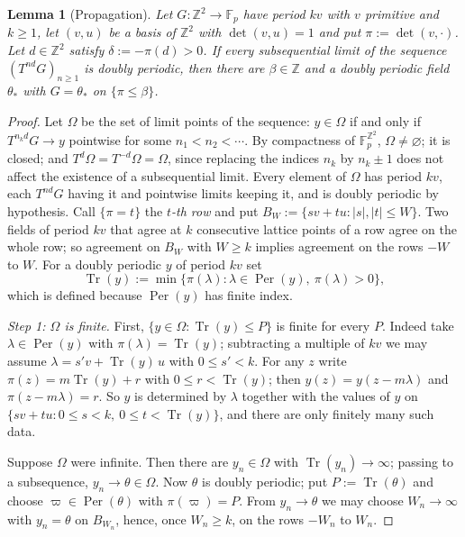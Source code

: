 \documentclass[11pt,reqno]{amsart}
\theoremstyle{plain}
\newtheorem{lem}[thm]{Lemma}
\theoremstyle{definition}
\theoremstyle{remark}
\theoremstyle{plain}
\theoremstyle{remark}
\theoremstyle{definition}
\numberwithin{equation}{section}
\DeclareMathOperator{\Per}{Per}
\DeclareMathOperator{\Tr}{Tr}
\newcommand{\Z}{\mathbb{Z}}
\newcommand{\Fp}{\mathbb{F}_p}
\begin{document}
\begin{lem}[Propagation]\label{lem:propagate2}
Let $G\colon\Z^2\to\Fp$ have period $kv$ with $v$ primitive and $k\ge1$, let
$(v,u)$ be a basis of $\Z^2$ with $\det(v,u)=1$ and put $\pi:=\det(v,\cdot)$.
Let $d\in\Z^2$ satisfy $\delta:=-\pi(d)>0$.  If every subsequential limit of the
sequence $(T^{nd}G)_{n\ge1}$ is doubly periodic, then there are $\beta\in\Z$ and
a doubly periodic field $\theta_*$ with $G=\theta_*$ on $\{\pi\le\beta\}$.
\end{lem}

\begin{proof}
Let $\Omega$ be the set of limit points of the sequence: $y\in\Omega$ if and only
if $T^{n_kd}G\to y$ pointwise for some $n_1<n_2<\cdots$.  By compactness of
$\Fp^{\Z^2}$, $\Omega\ne\varnothing$; it is closed; and
$T^{d}\Omega=T^{-d}\Omega=\Omega$, since replacing the indices $n_k$ by
$n_k\pm1$ does not affect the existence of a subsequential limit.  Every element
of $\Omega$ has period $kv$, each $T^{nd}G$ having it and pointwise limits
keeping it, and is doubly periodic by hypothesis.  Call $\{\pi=t\}$ the
\emph{$t$-th row} and put $B_W:=\{sv+tu:|s|,|t|\le W\}$.  Two fields of period
$kv$ that agree at $k$ consecutive lattice points of a row agree on the whole
row; so agreement on $B_W$ with $W\ge k$ implies agreement on the rows $-W$ to
$W$.  For a doubly periodic $y$ of period $kv$ set
\[\Tr(y):=\min\{\pi(\lambda):\lambda\in\Per(y),\ \pi(\lambda)>0\},\]
which is defined because $\Per(y)$ has finite index.

\emph{Step 1: $\Omega$ is finite.}  First, $\{y\in\Omega:\Tr(y)\le P\}$ is finite
for every $P$.  Indeed take $\lambda\in\Per(y)$ with $\pi(\lambda)=\Tr(y)$;
subtracting a multiple of $kv$ we may assume $\lambda=s'v+\Tr(y)\,u$ with
$0\le s'<k$.  For any $z$ write $\pi(z)=m\Tr(y)+r$ with $0\le r<\Tr(y)$; then
$y(z)=y(z-m\lambda)$ and $\pi(z-m\lambda)=r$.  So $y$ is determined by $\lambda$
together with the values of $y$ on
$\{sv+tu:0\le s<k,\ 0\le t<\Tr(y)\}$, and there are only finitely many such
data.

Suppose $\Omega$ were infinite.  Then there are $y_n\in\Omega$ with
$\Tr(y_n)\to\infty$; passing to a subsequence, $y_n\to\theta\in\Omega$.  Now
$\theta$ is doubly periodic; put $P:=\Tr(\theta)$ and choose
$\varpi\in\Per(\theta)$ with $\pi(\varpi)=P$.  From $y_n\to\theta$ we may choose
$W_n\to\infty$ with $y_n=\theta$ on $B_{W_n}$, hence, once $W_n\ge k$, on the
rows $-W_n$ to $W_n$.


\end{proof}
\end{document}
